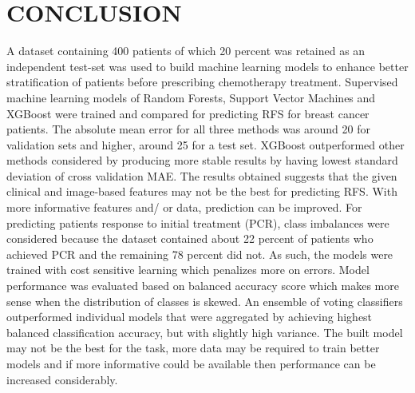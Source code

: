 \documentclass{article}
\begin{document}
\section{CONCLUSION}
A dataset containing 400 patients  of which 20 percent was retained as an independent test-set was used to build machine learning models to enhance better stratification of patients before prescribing chemotherapy treatment. 
Supervised machine learning models of Random Forests, Support Vector Machines and XGBoost were trained and compared for predicting RFS for breast cancer patients. The absolute mean error for all three methods was around 20 for validation sets and higher, around 25 for a test set. XGBoost outperformed other methods considered by producing more stable results by having lowest standard deviation of cross validation MAE. The results obtained suggests that the given clinical and image-based features may not be the best for predicting RFS. With more informative features and/ or data, prediction can be improved.
For predicting patients response to initial treatment (PCR), class imbalances were considered because the dataset contained about 22 percent of patients who achieved PCR and the remaining 78 percent did not. As such, the models were trained with cost sensitive learning which penalizes more on errors. Model performance was evaluated based on balanced accuracy score which makes more sense when the distribution of classes is skewed. An ensemble of voting classifiers outperformed individual models that were aggregated by achieving highest balanced classification accuracy, but with slightly high variance. The built model may not be the best for the task, more data may be required to train better models and if more informative could be available then performance can be increased considerably.




%
\end{document}
